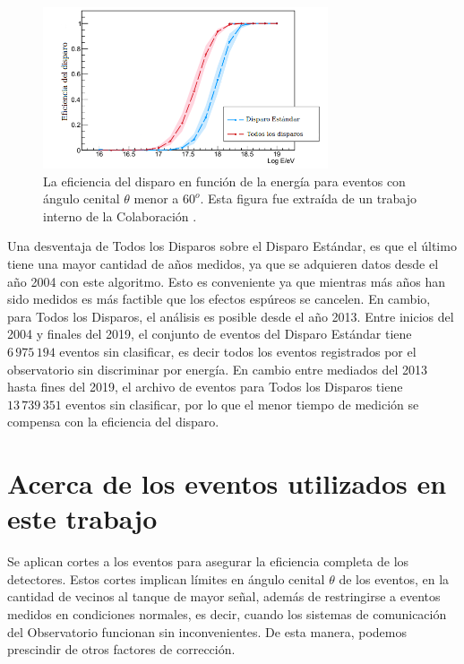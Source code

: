 \begin{figure}[H]
  \centering
  \includegraphics[width=0.75\textwidth]{comparacion_triggers.png}
  \caption{La eficiencia del disparo en función de la energía para eventos con ángulo cenital $\theta$ menor a $60^o$. Esta figura fue extraída de un trabajo interno de la Colaboración {\cite{triggers_ref}}.}
  \label{fig:triggers}
\end{figure}


Una desventaja de Todos los Disparos sobre el Disparo Estándar, es que el último tiene una mayor cantidad de años medidos, ya que se adquieren datos  desde el año 2004 con este algoritmo. Esto es conveniente ya que mientras más años han sido medidos es más factible que los efectos espúreos se cancelen. En cambio, para Todos los Disparos, el análisis  es posible desde el año 2013. Entre inicios del 2004 y finales del 2019, el conjunto de eventos del Disparo Estándar tiene $6\,975\,194$ eventos sin clasificar, es decir todos los eventos registrados por el observatorio sin discriminar por energía. En cambio entre mediados del 2013 hasta fines del 2019, el archivo de eventos para Todos los Disparos tiene $13\,739\,351$ eventos sin clasificar, por lo que el menor tiempo de medición se compensa con la eficiencia del disparo.


\section{Acerca de los eventos utilizados en este trabajo} \label{filtro}

Se aplican cortes a los eventos para asegurar la eficiencia completa de los detectores. Estos cortes implican límites en ángulo cenital $\theta$ de los eventos, en la cantidad de vecinos al tanque de mayor señal, además de restringirse a eventos medidos en condiciones normales, es decir, cuando los sistemas de comunicación del Observatorio funcionan sin inconvenientes. De esta manera, podemos prescindir de otros factores de corrección.

